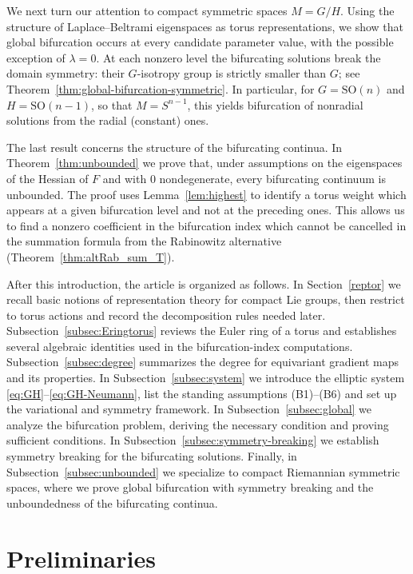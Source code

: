 \documentclass[reqno,twoside,12pt]{amsart}
\numberwithin{equation}{section} \errorcontextlines=0
\begin{document}
We next turn our attention to compact symmetric spaces $M=G/H$. Using the structure of Laplace--Beltrami eigenspaces as torus representations, we show that global bifurcation occurs at every candidate parameter value, with the possible exception of $\lambda=0$. At each nonzero level the bifurcating solutions break the domain symmetry: their $G$-isotropy group is strictly smaller than $G$; see Theorem~\ref{thm:global-bifurcation-symmetric}. In particular, for $G=\mathrm{SO}(n)$ and $H=\mathrm{SO}(n-1)$, so that $M=S^{n-1}$, this yields bifurcation of nonradial solutions from the radial (constant) ones.

The last result concerns the structure of the bifurcating continua. In Theorem~\ref{thm:unbounded} we prove that, under assumptions on the eigenspaces of the Hessian of $F$ and with $0$ nondegenerate, every bifurcating continuum is unbounded. The proof uses Lemma~\ref{lem:highest} to identify a torus weight which appears at a given bifurcation level and not at the preceding ones. This allows us to find a nonzero coefficient in the bifurcation index which cannot be cancelled in the summation formula from the Rabinowitz alternative (Theorem~\ref{thm:altRab_sum_T}).

After this introduction, the article is organized as follows. In Section~\ref{reptor} we recall basic notions of representation theory for compact Lie groups, then restrict to torus actions and record the decomposition rules needed later. Subsection~\ref{subsec:Eringtorus} reviews the Euler ring of a torus and establishes several algebraic identities used in the bifurcation-index computations. Subsection~\ref{subsec:degree} summarizes the degree for equivariant gradient maps and its properties.
In Subsection~\ref{subsec:system} we introduce the elliptic system \eqref{eq:GH}--\eqref{eq:GH-Neumann}, list the standing assumptions \textnormal{(B1)}--\textnormal{(B6)} and set up the variational and symmetry framework. In Subsection~\ref{subsec:global} we analyze the bifurcation problem, deriving the necessary condition and proving sufficient conditions. In Subsection~\ref{subsec:symmetry-breaking} we establish symmetry breaking for the bifurcating solutions. Finally, in Subsection~\ref{subsec:unbounded} we specialize to compact Riemannian symmetric spaces, where we prove global bifurcation with symmetry breaking and the unboundedness of the bifurcating continua.




\section{Preliminaries}\label{sec:prelim}
\end{document}
